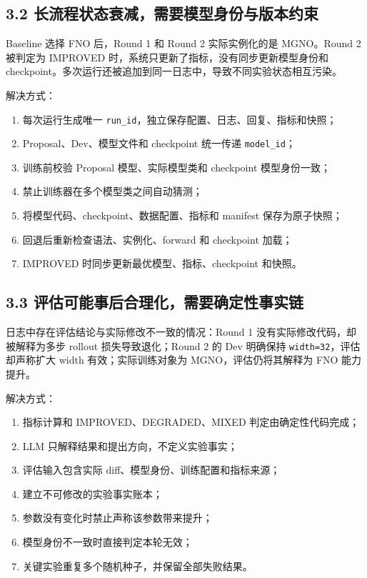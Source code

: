 \documentclass[UTF8,a4paper,zihao=-4]{ctexart}
\begin{document}
\subsection*{3.2 长流程状态衰减，需要模型身份与版本约束}

Baseline 选择 FNO 后，Round 1 和 Round 2 实际实例化的是 MGNO。Round 2 被判定为 IMPROVED 时，系统只更新了指标，没有同步更新模型身份和 checkpoint。多次运行还被追加到同一日志中，导致不同实验状态相互污染。

解决方式：

\begin{enumerate}[leftmargin=2em]
\item 每次运行生成唯一 \texttt{run\_id}，独立保存配置、日志、回复、指标和快照；
\item Proposal、Dev、模型文件和 checkpoint 统一传递 \texttt{model\_id}；
\item 训练前校验 Proposal 模型、实际模型类和 checkpoint 模型身份一致；
\item 禁止训练器在多个模型类之间自动猜测；
\item 将模型代码、checkpoint、数据配置、指标和 manifest 保存为原子快照；
\item 回退后重新检查语法、实例化、forward 和 checkpoint 加载；
\item IMPROVED 时同步更新最优模型、指标、checkpoint 和快照。
\end{enumerate}

\subsection*{3.3 评估可能事后合理化，需要确定性事实链}

日志中存在评估结论与实际修改不一致的情况：Round 1 没有实际修改代码，却被解释为多步 rollout 损失导致退化；Round 2 的 Dev 明确保持 \texttt{width=32}，评估却声称扩大 width 有效；实际训练对象为 MGNO，评估仍将其解释为 FNO 能力提升。

解决方式：

\begin{enumerate}[leftmargin=2em]
\item 指标计算和 IMPROVED、DEGRADED、MIXED 判定由确定性代码完成；
\item LLM 只解释结果和提出方向，不定义实验事实；
\item 评估输入包含实际 diff、模型身份、训练配置和指标来源；
\item 建立不可修改的实验事实账本；
\item 参数没有变化时禁止声称该参数带来提升；
\item 模型身份不一致时直接判定本轮无效；
\item 关键实验重复多个随机种子，并保留全部失败结果。
\end{enumerate}
\end{document}
